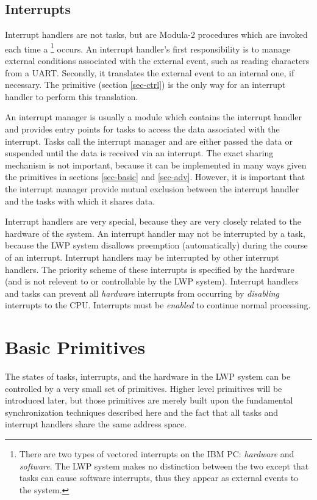 \subsection{Interrupts}

Interrupt handlers are not tasks, but are Modula-2 procedures which
are invoked each time a \footnote{
    There are two types of vectored interrupts on the IBM PC: 
    {\em hardware}
    and {\em software}.  The LWP system makes 
    no distinction between the two except that tasks can cause 
    software interrupts, thus they appear as external events
    to the system.} 
occurs.
An interrupt handler's first responsibility is to manage external conditions 
associated with the external event, such as reading characters from 
a UART.  Secondly, it translates
the external event to an internal one, if necessary.  The 
primitive (section \ref{sec-ctrl}) is the only way
for an interrupt handler to perform this translation.  

An interrupt manager is usually a module which contains the interrupt
handler and provides entry points for tasks to access the data associated
with the interrupt.  Tasks call the interrupt manager and are either
passed the data or suspended until the data is received via an
interrupt.  The exact sharing mechanism is not important, because 
it can be implemented in many ways given the primitives in 
sections \ref{sec-basic} and \ref{sec-adv}. However, it is important
that the interrupt manager provide mutual exclusion between the interrupt
handler and the tasks with which it shares data.

Interrupt handlers are very special, because they are very closely
related to the hardware of the system.  An interrupt handler may not
be interrupted by a task, because the LWP system disallows preemption
(automatically) during the course of an interrupt.  Interrupt handlers may 
be interrupted by other interrupt handlers.  The priority scheme of
these interrupts is specified by the hardware (and is not relevent to or 
controllable by the LWP system).  
Interrupt handlers and tasks can prevent all {\em hardware} interrupts 
from occurring by {\em disabling}
interrupts to the CPU.  Interrupts
must be {\em enabled}
to continue normal processing.

\section{Basic Primitives}
\label{sec-basic}
The states of tasks, interrupts, and the hardware in the LWP system can be 
controlled by a very small
set of primitives.  Higher level primitives will be introduced later,
but those primitives are merely built upon the fundamental synchronization
techniques described here and the fact that all tasks and interrupt handlers
share the same address space.

